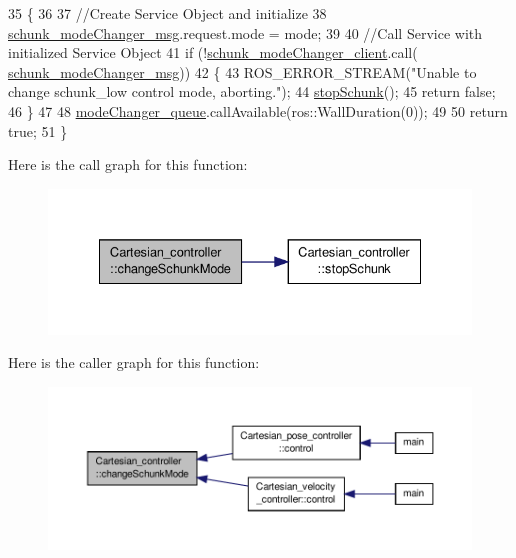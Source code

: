 \begin{DoxyCode}
35                                                    \{
36 
37         \textcolor{comment}{//Create Service Object and initialize}
38         \hyperlink{classCartesian__controller_a960d66580ba058d3337c89bdf8099948}{schunk\_modeChanger\_msg}.request.mode = mode;
39 
40         \textcolor{comment}{//Call Service with initialized Service Object}
41         \textcolor{keywordflow}{if} (!\hyperlink{classCartesian__controller_aee1fc445b64c534847ff0012132a5d2c}{schunk\_modeChanger\_client}.call(
      \hyperlink{classCartesian__controller_a960d66580ba058d3337c89bdf8099948}{schunk\_modeChanger\_msg}))
42         \{
43                 ROS\_ERROR\_STREAM(\textcolor{stringliteral}{"Unable to change schunk\_low control mode, aborting."});
44                 \hyperlink{classCartesian__controller_a3ba54e8b35632526c5e8eb2ab5d7de0d}{stopSchunk}();
45                 \textcolor{keywordflow}{return} \textcolor{keyword}{false};
46         \}
47 
48         \hyperlink{classCartesian__controller_adf47dc3a09bd9650015b25870054b60d}{modeChanger\_queue}.callAvailable(ros::WallDuration(0));
49 
50         \textcolor{keywordflow}{return} \textcolor{keyword}{true};
51 \}
\end{DoxyCode}


Here is the call graph for this function\-:\nopagebreak
\begin{figure}[H]
\begin{center}
\leavevmode
\includegraphics[width=332pt]{classCartesian__controller_aaf006f80e89c08cf040956afbb4cf3c0_cgraph}
\end{center}
\end{figure}




Here is the caller graph for this function\-:\nopagebreak
\begin{figure}[H]
\begin{center}
\leavevmode
\includegraphics[width=350pt]{classCartesian__controller_aaf006f80e89c08cf040956afbb4cf3c0_icgraph}
\end{center}
\end{figure}


